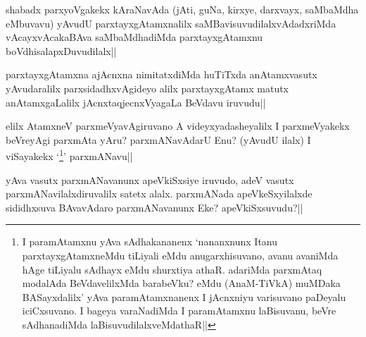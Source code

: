 
\begin{artha} 
shabadx parxyoVgakekx kAraNavAda (jAti, guNa, kirxye, darxvayx, 
saMbaMdha eMbuvavu) yAvudU parxtayxgAtamxnalilx 
saMBavisuvudilalxvAdadxriMda vAcayxvAcakaBAva saMbaMdhadiMda 
parxtayxgAtamxnu boVdhisalapxDuvudilalx||
\end{artha}


\begin{artha} 
parxtayxgAtamxna ajAcnxna nimitatxdiMda huTiTxda anAtamxvasutx 
yAvudaralilx parxsidadhxvAgideyo alilx parxtayxgAtamx matutx 
anAtamxgaLalilx jAcnxtaqjecnxVyagaLa BeVdavu iruvudu||
\end{artha}


\begin{artha} 
elilx AtamxneV parxmeVyavAgiruvano A videyxyadasheyalilx I 
parxmeVyakekx beVreyAgi parxmAta yAru? parxmANavAdarU Enu? (yAvudU 
ilalx) I viSayakekx `\footnote[1]{I paramAtamxnu yAva sAdhakananenx 
`nananxnunx Itanu parxtayxgAtamxneMdu tiLiyali eMdu anugarxhisuvano, 
avanu avaniMda hAge tiLiyalu sAdhayx eMdu shurxtiya athaR. adariMda 
parxmAtaq modalAda BeVdavelilxMda barabeVku? eMdu (AnaM-TiVkA) muMDaka 
BASayxdalilx' yAva paramAtamxnanenx I jAcnxniyu varisuvano paDeyalu 
iciCxsuvano. I bageya varaNadiMda I paramAtamxnu laBisuvanu, beVre 
sAdhanadiMda laBisuvudilalxveMdathaR||}\stext' parxmANavu||
\end{artha}


\begin{artha} 
yAva vasutx parxmANavanunx apeVkiSxsiye iruvudo, adeV vasutx 
parxmANavilalxdiruvalilx satetx alalx. parxmANada apeVkeSxyilalxde 
sididhxsuva BAvavAdaro parxmANavanunx Eke? apeVkiSxsuvudu?||
\end{artha}



